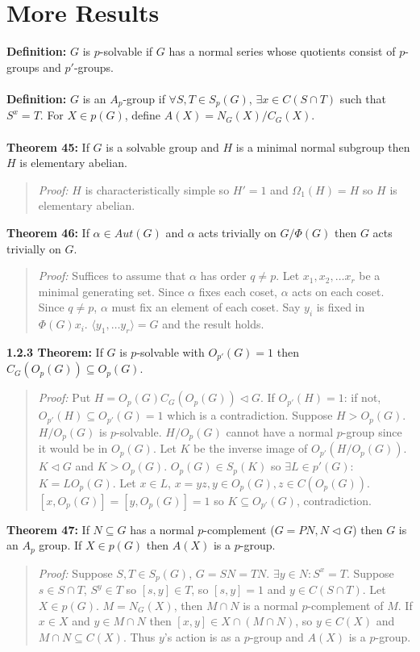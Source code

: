 \section {More Results}
{\bf Definition:} $G$ is $p$-solvable if $G$ has a normal series whose quotients consist of $p$-groups
and $p'$-groups.
\\
\\
{\bf Definition:} $G$ is an $A_p$-group if $\forall S, T \in S_p(G)$, $\exists x \in C(S \cap T)$ such that
$S^x = T$.  For $X \in p(G)$, define $A(X) = N_G(X)/C_G(X)$.
\\
\\
{\bf Theorem 45:} If $G$ is a solvable group and $H$ is a minimal normal subgroup then $H$ is elementary abelian.
\begin{quote}
\emph{Proof:}
$H$ is characteristically simple so $H' = 1$ and $\Omega_1(H) = H$ so $H$ is elementary abelian.
\end{quote}
{\bf Theorem 46:} If $\alpha \in Aut(G)$ and $\alpha$ acts trivially on $G/\Phi(G)$ then 
$G$ acts trivially on $G$.
\begin{quote}
\emph{Proof:}
Suffices to assume that $\alpha$ has order $q \neq p$.  Let $x_1 , x_2 , \ldots x_r$ be a minimal generating set.
Since $\alpha$ fixes each coset, $\alpha$ acts on each coset.  Since $q \neq p$, $\alpha$ must fix an element
of each coset. Say $y_i$ is fixed in $\Phi(G) x_i$.  $\langle y_1, \ldots y_r \rangle = G$ and the result holds.
\end{quote}
{\bf 1.2.3 Theorem:} If $G$ is $p$-solvable with $O_{p'}(G) = 1$ then $C_G(O_p(G)) \subseteq O_p(G)$.
\begin{quote}
\emph{Proof:}
Put $H = O_p(G) C_G(O_p(G)) \lhd G$.  If $O_{p'}(H) = 1$: if not, $O_{p'}(H) \subseteq O_{p'}(G) = 1$
which is a contradiction.  Suppose $H > O_p(G)$.  $H/O_p(G)$ is $p$-solvable.  $H/O_p(G)$ cannot have
a normal $p$-group since it would be in $O_p(G)$.  Let $K$ be the inverse image of $O_{p'}(H/O_p(G))$.
$K \lhd G$ and $K > O_p(G)$.  $O_p(G) \in S_p(K)$ so $\exists L \in p'(G)$: $K = LO_p(G)$.  Let $x \in L$,
$x = yz, y \in O_p(G), z \in C(O_p(G))$.  $[x, O_p(G)] = [y, O_p(G)] =1$ so $K \subseteq O_{p'}(G)$, contradiction.
\end{quote}
{\bf Theorem 47:} If $N \subseteq G$ has a normal $p$-complement ($G = P N, N \lhd G$) then $G$ is an
$A_p$ group.  If $X \in p(G)$ then $A(X)$ is a $p$-group.
\begin{quote}
\emph{Proof:}
Suppose $S, T \in S_p(G)$, $G = SN = TN$.  $\exists y \in N: S^x = T$.  Suppose $s \in S \cap T$, $S^y \in T$
so $[s, y] \in T$,  so $[s, y] = 1$ and $y \in C(S \cap T)$.  Let $X \in p(G)$.  $M = N_G(X)$, then $M \cap N$
is a normal $p$-complement of $M$.  If $x \in X$ and $y \in M \cap N$ then $[x,y] \in X \cap (M \cap N)$, so
$y \in C(X)$ and $M \cap N \subseteq C(X)$.  Thus $y$'s action is as a $p$-group and $A(X)$ is a $p$-group.
\end{quote}

